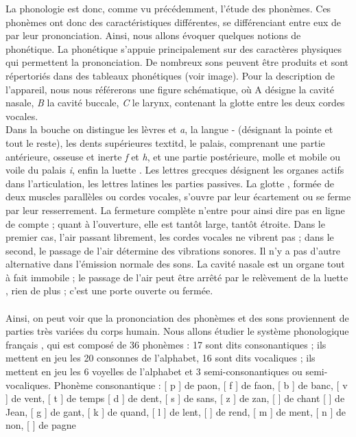 \documentclass[12pt, french, twoside]{report}
\begin{document}
La phonologie est donc, comme vu précédemment, l'étude des phonèmes. Ces phonèmes ont donc des caractéristiques différentes, se différenciant entre eux de par leur prononciation. Ainsi, nous allons évoquer quelques notions de phonétique. La phonétique s'appuie principalement sur des caractères physiques qui permettent la prononciation. De nombreux sons peuvent être produits et sont répertoriés dans des tableaux phonétiques \cite{Saussure} (voir image). 
Pour la description de l’appareil, nous nous référerons une figure schématique, où A désigne la cavité nasale, \textit{B} la cavité buccale, \textit{C} le larynx, contenant la glotte \varepsilon entre les deux cordes vocales. \\
Dans la bouche on distingue les lèvres \alpha et \textit{a}, la langue \beta - \gamma (\beta désignant la pointe et \gamma tout le reste), les dents supérieures textit{d}, le palais, comprenant une partie antérieure, osseuse et inerte \textit{f} et \textit{h}, et une partie postérieure, molle et mobile ou voile du palais \textit{i}, enfin la luette \delta .
Les lettres grecques désignent les organes actifs dans l’articulation, les lettres latines les parties passives. La glotte \varepsilon , formée de deux muscles parallèles ou cordes vocales, s’ouvre par leur écartement ou se ferme par leur resserrement. La fermeture complète n’entre pour ainsi dire pas en ligne de compte ; quant à l’ouverture, elle est tantôt large, tantôt étroite. Dans le premier cas, l’air passant librement, les cordes vocales ne vibrent pas ; dans le second, le passage de l’air détermine des vibrations sonores. Il n’y a pas d’autre alternative dans l’émission normale des sons. La cavité nasale est un organe tout à fait immobile ; le passage de l’air peut être arrêté par le relèvement de la luette \delta , rien de plus ; c’est une porte ouverte ou fermée. \\ \\    Ainsi, on peut voir que la prononciation des phonèmes et des sons proviennent de parties très variées du corps humain. Nous allons étudier le système phonologique français , qui est composé de 36 phonèmes : 17 sont dits consonantiques ; ils mettent en jeu les 20 consonnes de l’alphabet, 16 sont dits vocaliques ; ils mettent en jeu les 6 voyelles de l’alphabet et 3 semi-consonantiques ou semi-vocaliques. 
Phonème consonantique : [ p ] de paon, [ f ] de faon,  [ b ] de banc, [ v ] de vent, [ t ] de temps [ d ] de dent,  [ s ] de sans, [ z ] de zan, [ \textesh  ] de chant [ \textyogh  ] de Jean,  [ g ] de gant, [ k ] de quand,  [ l ] de lent, [ \textscr ] de rend,  [ m ] de ment, [ n ] de non,  [ \textltailn ] de pagne
\end{document}
